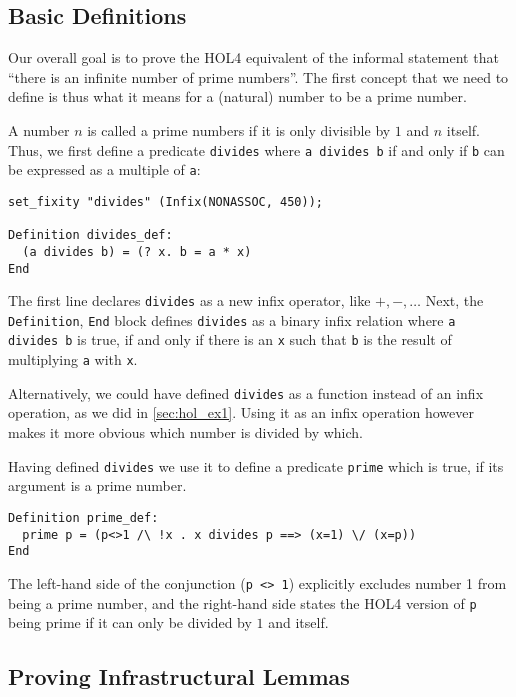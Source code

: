 \subsection{Basic Definitions}
Our overall goal is to prove the HOL4 equivalent of the informal statement that
``there is an infinite number of prime numbers''.
The first concept that we need to define is thus what it means for a (natural)
number to be a prime number.

A number $n$ is called a prime numbers if it is only divisible by $1$ and $n$
itself. Thus, we first define a predicate \lstinline{divides} where
\lstinline{a divides b} if and only if \lstinline{b} can be expressed as a
multiple of \lstinline{a}:

\begin{lstlisting}
set_fixity "divides" (Infix(NONASSOC, 450));

Definition divides_def:
  (a divides b) = (? x. b = a * x)
End
\end{lstlisting}
The first line declares \lstinline{divides} as a new infix operator, like $+,-, \ldots$
Next, the \lstinline{Definition}, \lstinline{End} block defines \lstinline{divides} as a
binary infix relation where \lstinline{a divides b} is true, if and only if
there is an \lstinline{x} such that \lstinline{b} is the result of multiplying \lstinline{a} with \lstinline{x}.

Alternatively, we could have defined \lstinline{divides} as a function instead
of an infix operation, as we did in \autoref{sec:hol_ex1}.
Using it as an infix operation however makes it more obvious which number is
divided by which.

Having defined \lstinline{divides} we use it to define a predicate
\lstinline{prime} which is true, if its argument is a prime number.
\begin{lstlisting}
Definition prime_def:
  prime p = (p<>1 /\ !x . x divides p ==> (x=1) \/ (x=p))
End
\end{lstlisting}

The left-hand side of the conjunction (\lstinline{p <> 1}) explicitly excludes
number 1 from being a prime number, and the right-hand side states the HOL4
version of \lstinline{p} being prime if it can only be divided by $1$ and itself.

\subsection{Proving Infrastructural Lemmas}

